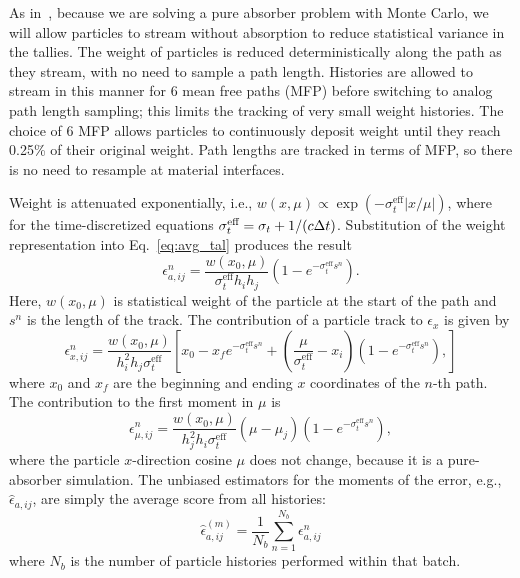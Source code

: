 As in~\cite{park}, because we are solving a pure absorber problem with Monte Carlo, we will allow
particles to stream without absorption to reduce statistical 
variance in the tallies.  The weight of particles is reduced deterministically along
the path as they stream, with no need to sample a path length. Histories are allowed to stream in this manner for 6 mean free paths (MFP)
before switching to analog path length sampling; this limits the tracking of very small weight histories. The choice of 6 MFP allows particles to 
continuously deposit weight until they reach 0.25\% of their original weight.  Path lengths are tracked in terms of MFP, so there is no need to resample at material
interfaces.

Weight is attenuated exponentially, i.e., $w(x,\mu)\propto
\exp(-\sigma_{t}^{\text{eff}}|x/\mu|)$, where for the time-discretized equations
$\sigma_{t}^{\text{eff}}=\sigma_t + 1/(c\Delta t)$. Substitution of the weight representation into
Eq.~\eqref{eq:avg_tal} produces the result
\begin{equation}
    \epsilon^n_{a,ij} = \frac{w(x_0,\mu)}{\sigma_{t}^{\text{eff}} h_i h_j} \left(1 -
    e^{-\sigma_{t}^{\text{eff}}s^n}\right).
\end{equation}
Here, $w(x_0,\mu)$ is statistical weight of the particle at the start of the path and $s^n$ is the
length of the track. The contribution of a
particle track to $\epsilon_x$ is given by
\begin{equation}
    \epsilon^n_{x,ij} = \frac{w(x_0,\mu)}{h_i^2h_j \sigma_{t}^{\text{eff}}} \left[x_0 - x_f e^{-\sigma_{t}^{\text{eff}} s^n}
        + \left(\frac{\mu}{\sigma_{t}^{\text{eff}}} - x_i \right)\left(1-e^{-\sigma_{t}^{\text{eff}} s^n}\right),
    \right]
\end{equation}
where $x_0$ and $x_f$ are the beginning and ending $x$ coordinates of the $n$-th
path.  The contribution to the first moment in $\mu$ is 
\begin{equation}
    \epsilon^n_{\mu,ij} = \frac{w(x_0,\mu)}{h_{j}^2h_i\sigma_{t}^{\text{eff}}}\left(\mu -
    \mu_j\right) \left(1 - e^{-\sigma_{t}^{\text{eff}}s^n}\right),
\end{equation}
where the particle $x$-direction cosine $\mu$ does not change, because it is a pure-absorber simulation.
The unbiased estimators for the moments of the error, e.g., $\hat \epsilon_{a,ij}$, are simply the
average score from all histories:
\begin{equation}
    \hat\epsilon_{a,ij}^{(m)}  = \frac{1}{N_b} \sum\limits_{n=1}^{N_b} \epsilon^n_{a,ij}
\end{equation}
where $N_b$ is the number of particle histories performed within that batch.


